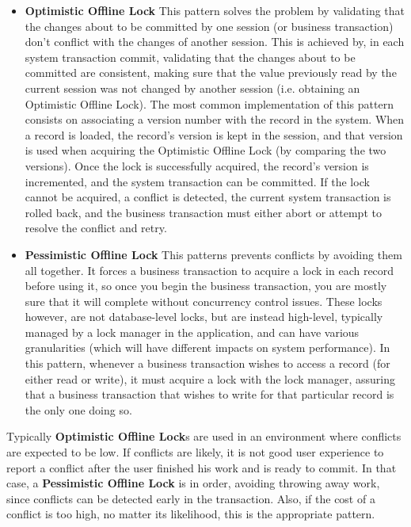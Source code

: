 \documentclass{llncs}
\begin{document}
\begin{itemize}
\item {\bf Optimistic Offline Lock} This pattern solves the problem by
  validating that the changes about to be committed by one session (or
  business transaction) don't conflict with the changes of another
  session. This is achieved by, in each system transaction commit,
  validating that the changes about to be committed are consistent,
  making sure that the value previously read by the current session
  was not changed by another session (i.e. obtaining an Optimistic
  Offline Lock).  The most common implementation of this pattern
  consists on associating a version number with the record in the
  system. When a record is loaded, the record's version is kept in the
  session, and that version is used when acquiring the Optimistic
  Offline Lock (by comparing the two versions). Once the lock is
  successfully acquired, the record's version is incremented, and the
  system transaction can be committed. If the lock cannot be acquired,
  a conflict is detected, the current system transaction is rolled
  back, and the business transaction must either abort or attempt to
  resolve the conflict and retry.

\item {\bf Pessimistic Offline Lock} This patterns prevents conflicts
  by avoiding them all together. It forces a business transaction to
  acquire a lock in each record before using it, so once you begin the
  business transaction, you are mostly sure that it will complete
  without concurrency control issues. These locks however, are not
  database-level locks, but are instead high-level, typically managed
  by a lock manager in the application, and can have various
  granularities (which will have different impacts on system
  performance). In this pattern, whenever a business transaction
  wishes to access a record (for either read or write), it must
  acquire a lock with the lock manager, assuring that a business
  transaction that wishes to write for that particular record is the
  only one doing so.
\end{itemize}

Typically {\bf Optimistic Offline Lock}s are used in an environment
where conflicts are expected to be low. If conflicts are likely, it is
not good user experience to report a conflict after the user finished
his work and is ready to commit. In that case, a {\bf Pessimistic
  Offline Lock} is in order, avoiding throwing away work, since
conflicts can be detected early in the transaction. Also, if the cost
of a conflict is too high, no matter its likelihood, this is the
appropriate pattern.
\end{document}
